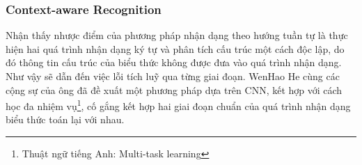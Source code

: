 \documentclass[a4paper,12pt]{article}
\begin{document}
	
	\subsubsection{Context-aware Recognition\cite{context}}
	\label{subsec: context}
	Nhận thấy nhược điểm của phương pháp nhận dạng theo hướng tuần tự là thực hiện hai quá trình nhận dạng ký tự và phân tích cấu trúc một cách độc lập, do đó thông tin cấu trúc của biểu thức không được đưa vào quá trình nhận dạng. Như vậy sẽ dẫn đến việc lỗi tích luỹ qua từng giai đoạn\cite{context}.
	WenHao He cùng các cộng sự của ông đã đề xuất một phương pháp dựa trên CNN, kết hợp với cách học đa nhiệm vụ\footnote{Thuật ngữ tiếng Anh: Multi-task learning}, cố gắng kết hợp hai giai đoạn chuẩn của quá trình nhận dạng biểu thức toán lại với nhau.
	
\end{document}
